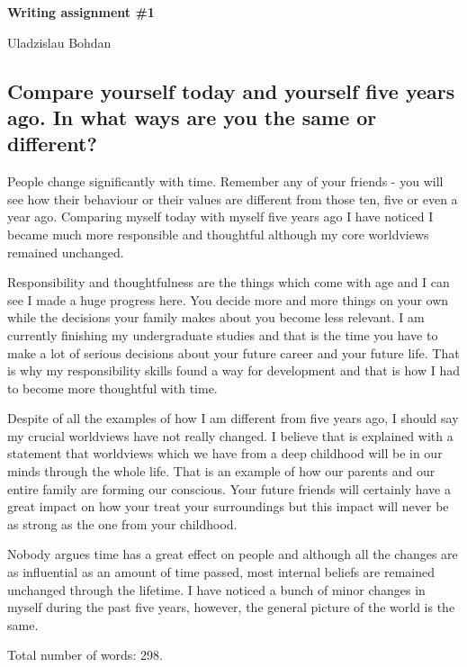 \documentclass[12pt]{article}
\begin{document}
{\Large

\textbf{Writing assignment \#1}

Uladzislau Bohdan

}

\vspace{10mm}

\subsection*{Compare yourself today and yourself five years ago. In what ways
are you the same or different?}

People change significantly with time. Remember any of your friends - you will
see how their behaviour or their values are different from those ten, five or
even a year ago. Comparing myself today with myself five years ago I have
noticed I became much more responsible and thoughtful although my core
worldviews remained unchanged.

Responsibility and thoughtfulness are the things which come with age and I can
see I made a huge progress here. You decide more and more things on
your own while the decisions your family makes about you become less relevant.
I am currently finishing my undergraduate studies and that is the time you
have to make a lot of serious decisions about your future career and your future
life. That is why my responsibility skills found a way for development and
that is how I had to become more thoughtful with time.

Despite of all the examples of how I am different from five years ago, I should
say my crucial worldviews have not really changed. I believe that is explained
with a statement that worldviews which we have from a deep childhood
will be in our minds through the whole life. That is an example of how our
parents and our entire family are forming our conscious. Your future friends
will certainly have a great impact on how your treat your surroundings but
this impact will never be as strong as the one from your childhood.

Nobody argues time has a great effect on people and although all the changes
are as influential as an amount of time passed, most internal beliefs are remained
unchanged through the lifetime. I have noticed a bunch of minor changes in myself
during the past five years, however, the general picture of the world is the same.

\vspace{15mm}

Total number of words: 298.
\end{document}
